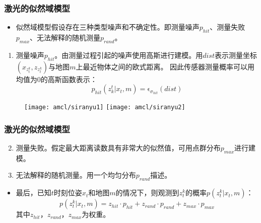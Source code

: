 \begin{frame}
  \frametitle{激光的似然域模型}

  \begin{itemize}
    \item 似然域模型假设存在三种类型噪声和不确定性。即测量噪声$p_{hit}$、测量失败$p_{max}$、无法解释的随机测量$p_{rand}$。

  \end{itemize}

  \begin{enumerate}
    \item 测量噪声$p_{hit}$。由测量过程引起的噪声使用高斯进行建模。用$dist$表示测量坐标$(x_{z_t^k}, z_{z_t^k})$与地图$m$上最近物体之间的欧式距离。
          因此传感器测量概率可以用均值为0的高斯函数表示： $$p_{hit}(z_k^t|x_t, m) = \mathrm{\epsilon}_{\sigma_{hit}}(dist)$$
  \end{enumerate}

  \begin{figure}[htbp]
    \texttt{[image: amcl/siranyu1]}
    \texttt{[image: amcl/siranyu2]}

  \end{figure}


\end{frame}

\begin{frame}
  \frametitle{激光的似然域模型}

  \begin{enumerate}
    \setcounter{enumi}{1}
    \item 测量失败。假定最大距离读数具有非常大的似然值，可用点群分布$p_{max}$进行建模。
    \item 无法解释的随机测量。用一个均匀分布$p_{rand}$描述。
  \end{enumerate}

  \begin{itemize}
    \item 最后，已知$t$时刻位姿$x_t$和地图$m$的情况下，则观测到$z_t^k$的概率$p(z_t^k | x_t, m)$：
          $$p(z_t^k|x_t, m) = z_{hit} \cdot p_{hit} + z_{rand} \cdot p_{rand} + z_{max} \cdot p_{max}$$
          其中$z_{hit}$，$z_{rand}$，$z_{max}$为权重。
  \end{itemize}
\end{frame}

